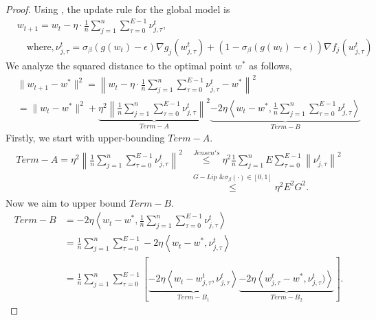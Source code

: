 \documentclass{article} %
\begin{document}
\begin{proof}
    Using , the update rule for the global model is
\begin{align*}
&w_{t+1} = w_t - \eta \cdot \frac{1}{n} \sum_{j=1}^n \sum_{\tau=0}^{E-1} \nu_{j,\tau}^t, 
\\
&\quad \text{where}, \nu_{j,\tau}^t = \sigma_{\beta}(g(w_t)-\epsilon)\nabla g_j(w_{j,\tau}^t) + (1 - \sigma_{\beta}(g(w_t)-\epsilon))\nabla f_j(w_{j,\tau}^t)
\end{align*}
We analyze the squared distance to the optimal point \( w^* \) as follows,
    \begin{align}
    \nonumber
    &\|w_{t+1} - w^*\|^2 
    = \left\| w_t - \eta \cdot \frac{1}{n} \sum_{j=1}^n \sum_{\tau=0}^{E-1} \nu_{j,\tau}^t - w^* \right\|^2 \\
    \label{eq:fedSSGM_start}
    &= \|w_t - w^*\|^2 + \underbrace{\eta^2 \left\| \frac{1}{n} \sum_{j=1}^n  \sum_{\tau=0}^{E-1} \nu_{j,\tau}^t \right\|^2}_{Term-A}
     \underbrace{- 2\eta \left\langle w_t - w^*, \frac{1}{n} \sum_{j=1}^n \sum_{\tau=0}^{E-1} \nu_{j,\tau}^t \right\rangle}_{Term-B}
\end{align}
Firstly, we start with upper-bounding $Term-A$. 
\begin{align*}
    \begin{aligned}
        Term-A = \eta^2 \left\| \frac{1}{n} \sum_{j=1}^n  \sum_{\tau=0}^{E-1} \nu_{j,\tau}^t\right\|^2 &\overset{Jensen's}{\leq} \eta^2 \frac{1}{n} \sum_{j=1}^n E \sum_{\tau=0}^{E-1}\left\|  \nu_{j,\tau}^t\right\|^2 
        \\
        & \overset{G-Lip \text{ \& } \sigma_{\beta}(\cdot)\in [0,1]}{\leq} \eta^2 E^2G^2.
    \end{aligned}
\end{align*}
Now we aim to upper bound $Term-B$.
\begin{equation*}
    \begin{aligned}
        Term-B &= - 2\eta \left\langle w_t - w^*, \frac{1}{n} \sum_{j=1}^n \sum_{\tau=0}^{E-1} \nu_{j,\tau}^t \right\rangle
        \\
        & = \frac{1}{n} \sum_{j=1}^n \sum_{\tau=0}^{E-1} - 2\eta \left\langle w_t - w^*, \nu_{j,\tau}^t \right\rangle
        \\
        & = \frac{1}{n} \sum_{j=1}^n \sum_{\tau=0}^{E-1}\left[\underbrace{- 2\eta \left\langle w_t - w_{j,\tau}^t , \nu_{j,\tau}^t \right\rangle}_{Term-B_1} \underbrace{- 2\eta\left\langle w_{j,\tau}^t - w^*, \nu_{j,\tau}^t ) \right\rangle}_{Term-B_2}\right].
    \end{aligned}

\end{equation*}
\end{proof}
\end{document}
